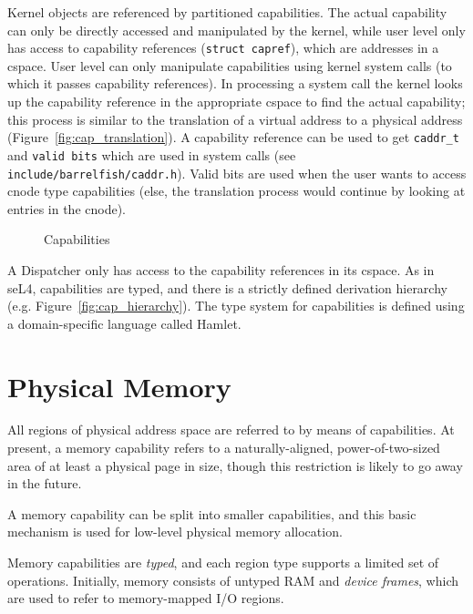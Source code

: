 \documentclass[a4paper,twoside]{report} %
\begin{document}
Kernel objects are referenced by partitioned capabilities. The actual
capability can only be directly accessed and manipulated by the
kernel, while user level only has access to capability references
(\texttt{struct capref}), which are addresses in a cspace. User level
can only manipulate capabilities using kernel system calls (to which
it passes capability references). In processing a system call the 
kernel looks up the capability reference in the appropriate cspace to find the
actual capability; this process is similar to the translation of a virtual
address to a physical address (Figure~\ref{fig:cap_translation}). A capability
reference can be used to get \texttt{caddr\_t} and \texttt{valid bits} which are
used in system calls (see \texttt{include/barrelfish/caddr.h}).  Valid bits are
used when the user wants to access cnode type capabilities (else, the
translation process would continue by looking at entries in the cnode).
 
\begin{figure}
  \centering
  \quad
  \caption{Capabilities}
  \label{fig:caps}
\end{figure}

A Dispatcher only has access to the capability references in its cspace. As in
seL4, capabilities are typed, and there is a strictly defined derivation
hierarchy (e.g. Figure~\ref{fig:cap_hierarchy}).  The type system for
capabilities is defined using a domain-specific language called
Hamlet. 

\section{Physical Memory}

All regions of physical address space are referred to by means of
capabilities.  At present, a memory capability refers to a
naturally-aligned, power-of-two-sized area of at least a physical page
in size, though this restriction is likely to go away in the future. 

A memory capability can be split into smaller capabilities, and this
basic mechanism is used for low-level physical memory allocation. 

Memory capabilities are \emph{typed}, and each region type supports a
limited set of operations.  Initially, memory consists of untyped RAM
and \emph{device frames}, which are used to refer to memory-mapped I/O
regions. 
\end{document}
